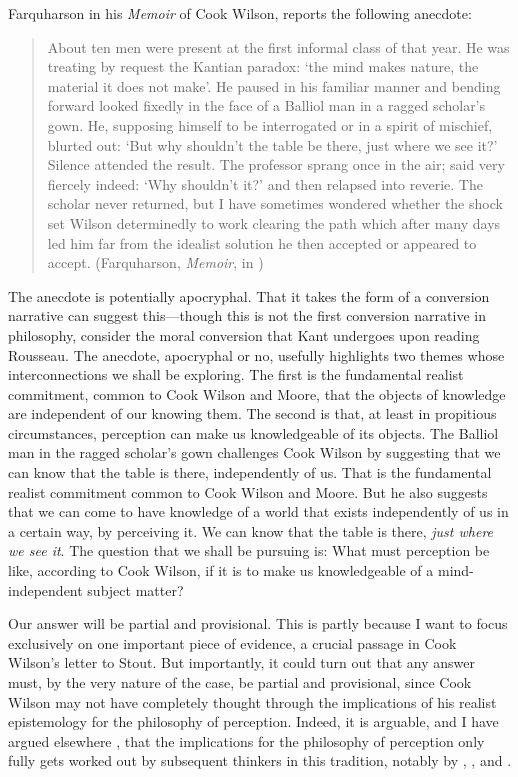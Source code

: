 \documentclass[12pt]{article}
\begin{document}
Farquharson in his \emph{Memoir} of Cook Wilson, reports the following anecdote:
\begin{quote}
	About ten men were present at the first informal class of that year. He was treating by request the Kantian paradox: `the mind makes nature, the material it does not make'. He paused in his familiar manner and bending forward looked fixedly in the face of a Balliol man in a ragged scholar's gown. He, supposing himself to be interrogated or in a spirit of mischief, blurted out: `But why shouldn't the table be there, just where we see it?' Silence attended the result. The professor sprang once in the air; said very fiercely indeed: `Why shouldn't it?' and then relapsed into reverie. The scholar never returned, but I have sometimes wondered whether the shock set Wilson determinedly to work clearing the path which after many days led him far from the idealist solution he then accepted or appeared to accept. (Farquharson, \emph{Memoir}, in \citealt[]{Cook-Wilson:1926sf})
\end{quote}
The anecdote is potentially apocryphal. That it takes the form of a conversion narrative can suggest this---though this is not the first conversion narrative in philosophy, consider the moral conversion that Kant undergoes upon reading Rousseau. The anecdote, apocryphal or no, usefully highlights two themes whose interconnections we shall be exploring. The first is the fundamental realist commitment, common to Cook Wilson and Moore, that the objects of knowledge are independent of our knowing them. The second is that, at least in propitious circumstances, perception can make us knowledgeable of its objects. The Balliol man in the ragged scholar's gown challenges Cook Wilson by suggesting that we can know that the table is there, independently of us. That is the fundamental realist commitment common to Cook Wilson and Moore. But he also suggests that we can come to have knowledge of a world that exists independently of us in a certain way, by perceiving it. We can know that the table is there, \emph{just where we see it}. The question that we shall be pursuing is: What must perception be like, according to Cook Wilson, if it is to make us knowledgeable of a mind-independent subject matter? 

Our answer will be partial and provisional. This is partly because I want to focus exclusively on one important piece of evidence, a crucial passage in Cook Wilson's letter to Stout. But importantly, it could turn out that any answer must, by the very nature of the case, be partial and provisional, since Cook Wilson may not have completely thought through the implications of his realist epistemology for the philosophy of perception. Indeed, it is arguable, and I have argued elsewhere \citep{Kalderon:2010fk}, that the implications for the philosophy of perception only fully gets worked out by subsequent thinkers in this tradition, notably by \citet{Prichard:1938ve}, \citet{Austin:1962lr}, and \citet{Hinton:1973js}.
\end{document}
